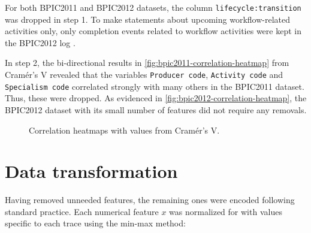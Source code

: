 For both BPIC2011 and BPIC2012 datasets, the column \texttt{lifecycle:transition} was dropped in step 1. To make statements about upcoming workflow-related activities only, only completion events related to workflow activities were kept in the BPIC2012 log \cite{evermann2016}.

In step 2, the bi-directional results in \autoref{fig:bpic2011-correlation-heatmap} from Cramér's V revealed that the variables \texttt{Producer code}, \texttt{Activity code} and \texttt{Specialism code} correlated strongly with many others in the BPIC2011 dataset. Thus, these were dropped. As evidenced in \autoref{fig:bpic2012-correlation-heatmap}, the BPIC2012 dataset with its small number of features did not require any removals.

\begin{figure}
\centering
{}
\qquad
{}
\caption{Correlation heatmaps with values from Cramér's V.}
\end{figure}

\section{Data transformation}
Having removed unneeded features, the remaining ones were encoded following standard practice. Each numerical feature $x$ was normalized for with values specific to each trace using the min-max method:


